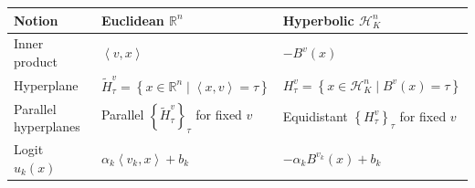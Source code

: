 \documentclass[border=8pt]{standalone}
\begin{document}
\renewcommand{\arraystretch}{1.3}
\setlength{\tabcolsep}{10pt}
\begin{tabular}{lll}
\toprule
Notion & Euclidean $\mathbb{R}^{n}$ & Hyperbolic $\mathcal{H}^{n}_{K}$ \\
\midrule
Inner product
& $\left\langle v,x\right\rangle$
& $-B^{v}(x)$ \\
Hyperplane
& $\widetilde{H}^{v}_{\tau}=\left\{x\in\mathbb{R}^{n}\mid\left\langle x,v\right\rangle=\tau\right\}$
& $H^{v}_{\tau}=\left\{x\in\mathcal{H}^{n}_{K}\mid B^{v}(x)=\tau\right\}$ \\
Parallel hyperplanes
& Parallel $\left\{\widetilde{H}^{v}_{\tau}\right\}_{\tau}$ for fixed $v$
& Equidistant $\left\{H^{v}_{\tau}\right\}_{\tau}$ for fixed $v$ \\
Logit $u_k(x)$
& $\alpha_k\left\langle v_k,x\right\rangle+b_k$
& $-\alpha_kB^{v_k}(x)+b_k$ \\
\bottomrule
\end{tabular}
\end{document}
